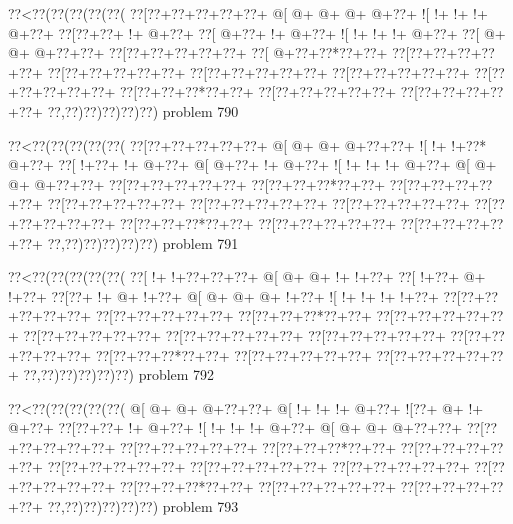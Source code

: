 \vbox{\vbox{\goo
\0??<\0??(\0??(\0??(\0??(\0??(
\0??[\0??+\0??+\0??+\0??+\0??+
\- @[\- @+\- @+\- @+\- @+\0??+
\- ![\- !+\- !+\- !+\- @+\0??+
\0??[\0??+\0??+\- !+\- @+\0??+
\0??[\- @+\0??+\- !+\- @+\0??+
\- ![\- !+\- !+\- !+\- @+\0??+
\0??[\- @+\- @+\- @+\0??+\0??+
\0??[\0??+\0??+\0??+\0??+\0??+
\0??[\- @+\0??+\0??*\0??+\0??+
\0??[\0??+\0??+\0??+\0??+\0??+
\0??[\0??+\0??+\0??+\0??+\0??+
\0??[\0??+\0??+\0??+\0??+\0??+
\0??[\0??+\0??+\0??+\0??+\0??+
\0??[\0??+\0??+\0??+\0??+\0??+
\0??[\0??+\0??+\0??*\0??+\0??+
\0??[\0??+\0??+\0??+\0??+\0??+
\0??[\0??+\0??+\0??+\0??+\0??+
\0??,\0??)\0??)\0??)\0??)\0??)
}
\hfil problem 790\hfil\break
}

\vbox{\vbox{\goo
\0??<\0??(\0??(\0??(\0??(\0??(
\0??[\0??+\0??+\0??+\0??+\0??+
\- @[\- @+\- @+\- @+\0??+\0??+
\- ![\- !+\- !+\0??*\- @+\0??+
\0??[\- !+\0??+\- !+\- @+\0??+
\- @[\- @+\0??+\- !+\- @+\0??+
\- ![\- !+\- !+\- !+\- @+\0??+
\- @[\- @+\- @+\- @+\0??+\0??+
\0??[\0??+\0??+\0??+\0??+\0??+
\0??[\0??+\0??+\0??*\0??+\0??+
\0??[\0??+\0??+\0??+\0??+\0??+
\0??[\0??+\0??+\0??+\0??+\0??+
\0??[\0??+\0??+\0??+\0??+\0??+
\0??[\0??+\0??+\0??+\0??+\0??+
\0??[\0??+\0??+\0??+\0??+\0??+
\0??[\0??+\0??+\0??*\0??+\0??+
\0??[\0??+\0??+\0??+\0??+\0??+
\0??[\0??+\0??+\0??+\0??+\0??+
\0??,\0??)\0??)\0??)\0??)\0??)
}
\hfil problem 791\hfil\break
}

\vbox{\vbox{\goo
\0??<\0??(\0??(\0??(\0??(\0??(
\0??[\- !+\- !+\0??+\0??+\0??+
\- @[\- @+\- @+\- !+\- !+\0??+
\0??[\- !+\0??+\- @+\- !+\0??+
\0??[\0??+\- !+\- @+\- !+\0??+
\- @[\- @+\- @+\- @+\- !+\0??+
\- ![\- !+\- !+\- !+\- !+\0??+
\0??[\0??+\0??+\0??+\0??+\0??+
\0??[\0??+\0??+\0??+\0??+\0??+
\0??[\0??+\0??+\0??*\0??+\0??+
\0??[\0??+\0??+\0??+\0??+\0??+
\0??[\0??+\0??+\0??+\0??+\0??+
\0??[\0??+\0??+\0??+\0??+\0??+
\0??[\0??+\0??+\0??+\0??+\0??+
\0??[\0??+\0??+\0??+\0??+\0??+
\0??[\0??+\0??+\0??*\0??+\0??+
\0??[\0??+\0??+\0??+\0??+\0??+
\0??[\0??+\0??+\0??+\0??+\0??+
\0??,\0??)\0??)\0??)\0??)\0??)
}
\hfil problem 792\hfil\break
}

\vbox{\vbox{\goo
\0??<\0??(\0??(\0??(\0??(\0??(
\- @[\- @+\- @+\- @+\0??+\0??+
\- @[\- !+\- !+\- !+\- @+\0??+
\- ![\0??+\- @+\- !+\- @+\0??+
\0??[\0??+\0??+\- !+\- @+\0??+
\- ![\- !+\- !+\- !+\- @+\0??+
\- @[\- @+\- @+\- @+\0??+\0??+
\0??[\0??+\0??+\0??+\0??+\0??+
\0??[\0??+\0??+\0??+\0??+\0??+
\0??[\0??+\0??+\0??*\0??+\0??+
\0??[\0??+\0??+\0??+\0??+\0??+
\0??[\0??+\0??+\0??+\0??+\0??+
\0??[\0??+\0??+\0??+\0??+\0??+
\0??[\0??+\0??+\0??+\0??+\0??+
\0??[\0??+\0??+\0??+\0??+\0??+
\0??[\0??+\0??+\0??*\0??+\0??+
\0??[\0??+\0??+\0??+\0??+\0??+
\0??[\0??+\0??+\0??+\0??+\0??+
\0??,\0??)\0??)\0??)\0??)\0??)
}
\hfil problem 793\hfil\break
}


